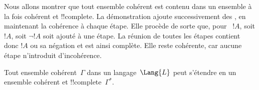 \documentclass[../../../include/open-logic-section]{subfiles}
\begin{document}
      {}
      {}


\begin{explain}
Nous allons montrer que tout ensemble cohérent  est
contenu dans un ensemble à la fois cohérent et !!{complete}. La
démonstration ajoute successivement des , en maintenant la
cohérence à chaque étape. Elle procède de sorte que, pour ~$!A$, soit $!A$, soit $\lnot !A$ soit ajouté à une
étape. La réunion de toutes les étapes contient donc $!A$ ou sa
négation et est ainsi complète. Elle reste cohérente, car aucune
étape n'introduit d'incohérence.
\end{explain}

\begin{lem}
 Tout ensemble cohérent~$\Gamma$ dans un
langage~$\Lang{L}$ peut s'étendre en un ensemble cohérent et
!!{complete}~$\Gamma^*$.
\end{lem}
\end{document}
